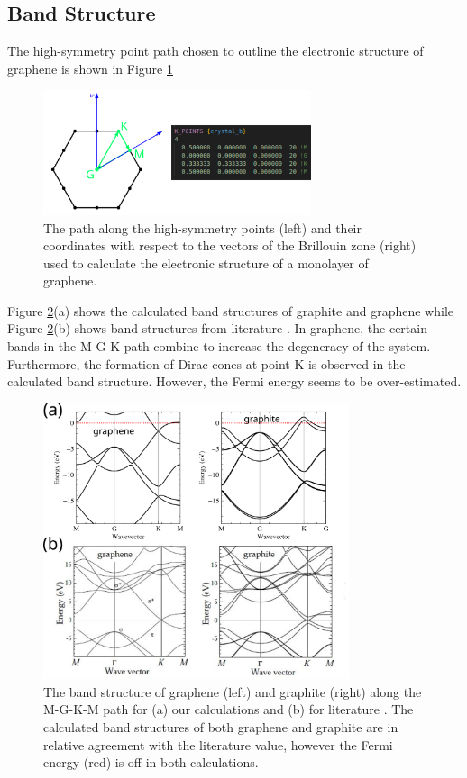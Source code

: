 \documentclass[10pt,a4paper]{labreport}
\begin{document}
\subsection{Band Structure}
The high-symmetry point path chosen to outline the electronic structure of graphene is shown in Figure \ref{fig:ass2_kpoints}
\begin{figure}[h]
    \centering 
    \includegraphics[width = 0.7\textwidth]{figs/ass2_graphene_kpoints.png}
    \caption{The path along the high-symmetry points (left) and their coordinates with respect to the vectors of the Brillouin zone (right) used to calculate the electronic structure of a monolayer of graphene. }
    \label{fig:ass2_kpoints}
  \end{figure}

Figure \ref{fig:ass2_bands}(a) shows the calculated band structures of graphite and graphene while Figure \ref{fig:ass2_bands}(b) shows band structures from literature \cite{newsonDynamicsCarriersPhotoinjected2010a}. In graphene, the certain bands in the M-G-K path combine to increase the degeneracy of the system. Furthermore, the formation of Dirac cones at point K is observed in the calculated band structure. However, the Fermi energy seems to be over-estimated.   
\begin{figure}[h!]
  \centering 
  \includegraphics[width = 0.8\textwidth]{figs/ass2_graphene_bands.png}
  \caption{The band structure of graphene (left) and graphite (right) along the M-G-K-M path for (a) our calculations and (b) for literature \cite{newsonDynamicsCarriersPhotoinjected2010a}. The calculated band structures of both graphene and graphite are in relative agreement with the literature value, however the Fermi energy (red) is off in both calculations. }
  \label{fig:ass2_bands}
\end{figure}
\end{document}
